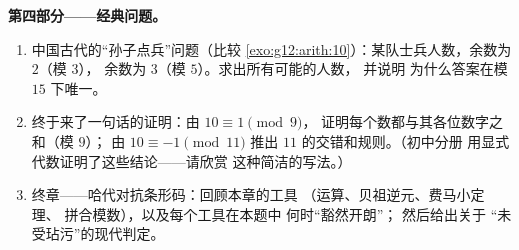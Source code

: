 \begin{problem}
\medskip
\noindent\textbf{第四部分——经典问题。}
\begin{enumerate}[resume]
  \item 中国古代的“孙子点兵”问题（比较
        \cref{exo:g12:arith:10}）：某队士兵人数，余数为 $2$（模 $3$），
        余数为 $3$（模 $5$）。求出所有可能的人数，
        并说明
        为什么答案在模 $15$ 下唯一。
  \item 终于来了一句话的证明：由 $10 \equiv 1 \pmod 9$，
        证明每个数都与其各位数字之和（模 $9$）；
        由 $10 \equiv -1 \pmod{11}$ 推出
        $11$ 的交错和规则。（初中分册
        用显式代数证明了这些结论——请欣赏
        这种简洁的写法。）
  \item 终章——哈代对抗条形码：回顾本章的工具
        （运算、贝祖逆元、费马小定理、
        拼合模数），以及每个工具在本题中
        何时“豁然开朗”；
        然后给出关于
        “未受玷污”的现代判定。
\end{enumerate}
\end{problem}
